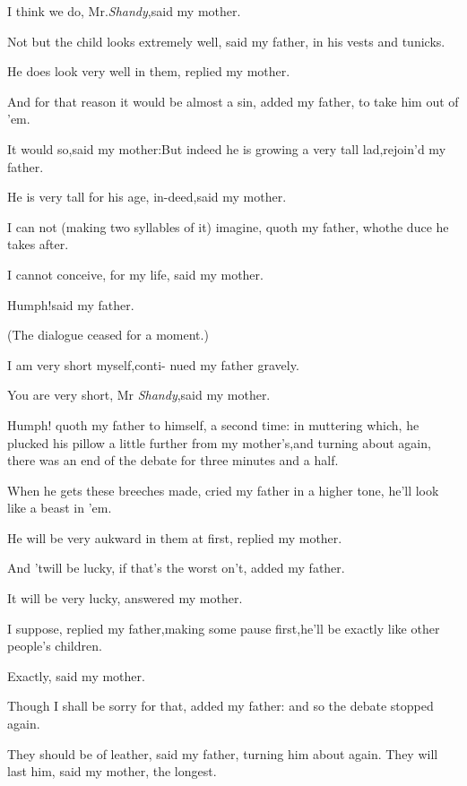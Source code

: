\documentclass{article}
\begin{document}
I think we do, Mr.\@ \textit{Shandy},\tsk said my mother.

\tsh Not but the child looks extremely well, said my
father, in his vests and tunicks.\tsh

\newpage
\tsh He does look very well in them,\break
\tsk replied my mother.\tsh

\tsh And for that reason it would be almost a sin,
added my father, to take him out of ’em.\tsh

\tsh It would so,\tsk said my
mother:\break\tsh But indeed he is growing a very tall
lad,\tsk rejoin’d my father.

\tsh He is very tall for his age, in-\break deed,\tsk said my
mother.\tsh

\tsh I can not (making two syllables of it) imagine,
quoth my father, who\break the duce he takes after.\tsh

I cannot conceive, for my life, said my
mother.\tsh

\newpage
Humph!\tsh said my father.

(The dialogue ceased for a moment.)

\tsh I am very short myself,\tsk conti-\break 
nued my father gravely.

You are very short, Mr \textit{Shandy},\tsk\break said my mother.

Humph! quoth my father to himself, a second time: in muttering
which, he plucked his pillow a little further from my
mother’s,\tsk and turning about again, there was an end of
the debate for three minutes and a half.

\tsh When he gets these breeches made, cried my father
in a higher tone, he’ll look like a beast in ’em.

\newpage
He will be very aukward in them at first, replied my mother.\tsh

\tsh And ’twill be lucky, if that’s\break
the worst on’t, added my father.

It will be very lucky, answered my mother.

I suppose, replied my father,\tsk making some pause
first,\tsk he’ll be exactly like other people’s
children.\tsh

Exactly, said my mother.\tsh

\tsh Though I shall be sorry for that, added my father:
and so the debate stopped again.

\tsh They should be of leather, said my father, turning
him about again.\tsk\pb 
They will last him, said my mother, the longest.
\end{document}
